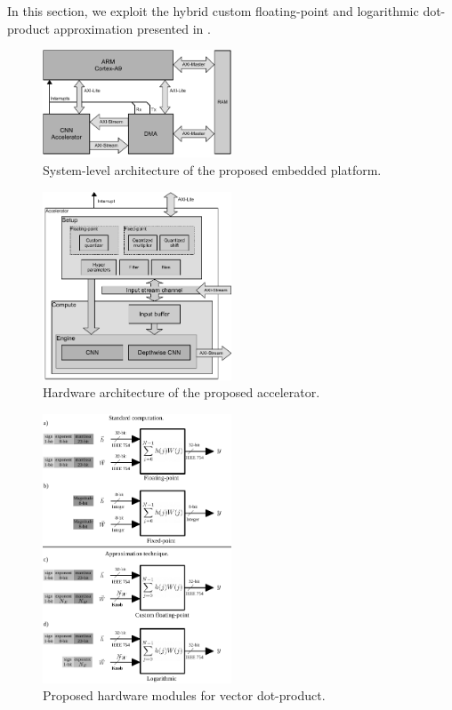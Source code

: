 In this section, we exploit the hybrid custom floating-point and logarithmic dot-product approximation presented in \cite{nevarez2021accelerating}.


\begin{figure}[t!]
	\centering
	\includegraphics[width=0.5\textwidth]{../figures/system_design.pdf}
	\caption{System-level architecture of the proposed embedded platform.}
	\label{fig:system_architecture}
\end{figure}

\begin{figure}[t!]
	\centering
	\includegraphics[width=0.5\textwidth]{../figures/accelerator.pdf}
	\caption{Hardware architecture of the proposed accelerator.}
	\label{fig:accelerator}
\end{figure}

\begin{figure}[t!]
	\centering
	\includegraphics[width=0.5\textwidth]{../figures/dot-product_unit.pdf}
	\caption{Proposed hardware modules for vector dot-product.}
	\label{fig:dot_product}
\end{figure}

